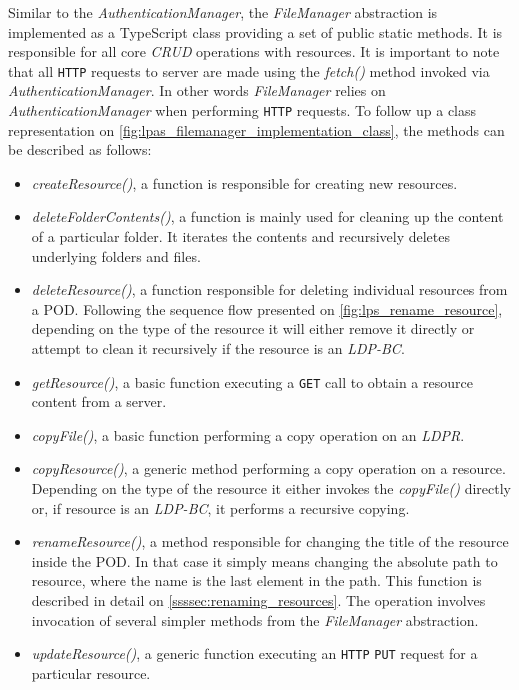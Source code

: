 Similar to the \textit{AuthenticationManager}, the \textit{FileManager} abstraction is implemented as a TypeScript class providing a set of public static methods. It is responsible for all core \textit{CRUD} operations with \solid{} resources. It is important to note that all \texttt{HTTP} requests to \solid{} server are made using the \textit{fetch()} method invoked via \textit{AuthenticationManager}. In other words \textit{FileManager} relies on \textit{AuthenticationManager} when performing \texttt{HTTP} requests. To follow up a class representation on \autoref{fig:lpas_filemanager_implementation_class}, the methods can be described as follows:
\begin{itemize}
    \item \textit{createResource()}, a function is responsible for creating new \solid{} resources. 
    \item \textit{deleteFolderContents()}, a function is mainly used for cleaning up the content of a particular folder. It iterates the contents and recursively deletes underlying folders and files.
    \item \textit{deleteResource()}, a function responsible for deleting individual resources from a \solid{} POD. Following the sequence flow presented on \autoref{fig:lps_rename_resource}, depending on the type of the resource it will either remove it directly or attempt to clean it recursively if the resource is an \textit{LDP-BC}.
    \item \textit{getResource()}, a basic function executing a \texttt{GET} call to obtain a resource content from a \solid{} server.
    \item \textit{copyFile()}, a basic function performing a copy operation on an \textit{LDPR}.
    \item \textit{copyResource()}, a generic method performing a copy operation on a resource. Depending on the type of the resource it either invokes the \textit{copyFile()} directly or, if resource is an \textit{LDP-BC}, it performs a recursive copying.
    \item \textit{renameResource()}, a method responsible for changing the title of the resource inside the \solid{} POD. In that case it simply means changing the absolute path to resource, where the name is the last element in the path. This function is described in detail on \autoref{ssssec:renaming_resources}. The operation involves invocation of several simpler methods from the \textit{FileManager} abstraction.
    \item \textit{updateResource()}, a generic function executing an \texttt{HTTP} \texttt{PUT} request for a particular resource.

\end{itemize}

